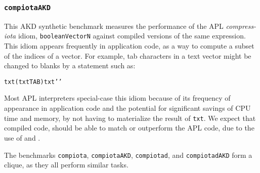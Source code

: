 \subsubsection{\tt compiotaAKD}
\label{benchmarkcompiotaakd}

This AKD synthetic benchmark measures the performance of the
APL { \em compress-iota} idiom, {\tt booleanVector\qslash\qiota\0N}
against compiled versions of the same expression.
This idiom appears frequently in application code, as a
way to compute a subset of the indices of a vector.
For example, tab characters in a text vector might be
changed to blanks by a statement such as:

{\tt txt\qlbr (txt\qeps\0TAB)\qslash\qiota\qrho\0txt\qrbr\qlarrow'\qblank'}

Most APL interpreters special-case this idiom because of its
frequency of appearance in application code and the potential
for significant savings of CPU time and memory, by not having
to materialize the result of {\tt \qiota\qrho\0txt}. We expect
that compiled \sac code, should be able to match or outperform the APL code,
due to the use of \wlf and \awlf.

The benchmarks {\tt compiota}, {\tt compiotaAKD}, {\tt compiotad}, and
{\tt compiotadAKD} form a clique, as they
all perform similar tasks.
